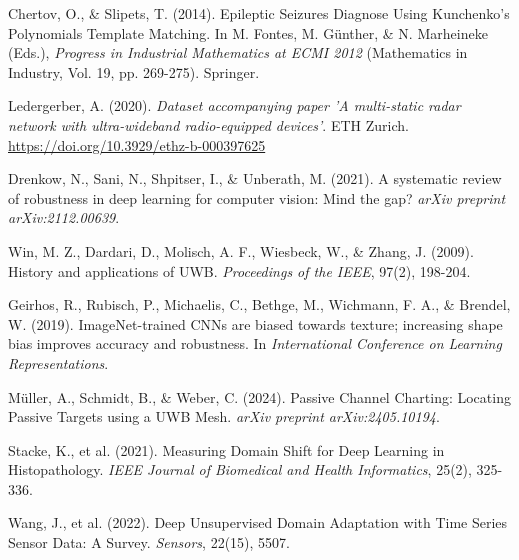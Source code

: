 \documentclass[12pt,a4paper]{article}
\begin{document}
\begin{thebibliography}{99}
		Chertov, O., \& Slipets, T. (2014). Epileptic Seizures Diagnose Using Kunchenko’s Polynomials Template Matching. In M. Fontes, M. Günther, \& N. Marheineke (Eds.), \textit{Progress in Industrial Mathematics at ECMI 2012} (Mathematics in Industry, Vol. 19, pp. 269-275). Springer.
		
		Ledergerber, A. (2020). \textit{Dataset accompanying paper 'A multi-static radar network with ultra-wideband radio-equipped devices'}. ETH Zurich. \url{https://doi.org/10.3929/ethz-b-000397625}
		
		
		
		
		Drenkow, N., Sani, N., Shpitser, I., \& Unberath, M. (2021). A systematic review of robustness in deep learning for computer vision: Mind the gap? \textit{arXiv preprint arXiv:2112.00639}.
		
		
		
		
	
		
		
		
		
		
		Win, M. Z., Dardari, D., Molisch, A. F., Wiesbeck, W., \& Zhang, J. (2009). History and applications of UWB. \textit{Proceedings of the IEEE}, 97(2), 198-204.
		
		
		
		
		Geirhos, R., Rubisch, P., Michaelis, C., Bethge, M., Wichmann, F. A., \& Brendel, W. (2019). ImageNet-trained CNNs are biased towards texture; increasing shape bias improves accuracy and robustness. In \textit{International Conference on Learning Representations}.
		
		
		Müller, A., Schmidt, B., \& Weber, C. (2024). Passive Channel Charting: Locating Passive Targets using a UWB Mesh. \textit{arXiv preprint arXiv:2405.10194}.
		
		Stacke, K., et al. (2021). Measuring Domain Shift for Deep Learning in Histopathology. \textit{IEEE Journal of Biomedical and Health Informatics}, 25(2), 325-336.
		
		Wang, J., et al. (2022). Deep Unsupervised Domain Adaptation with Time Series Sensor Data: A Survey. \textit{Sensors}, 22(15), 5507.
		

\end{thebibliography}
\end{document}
